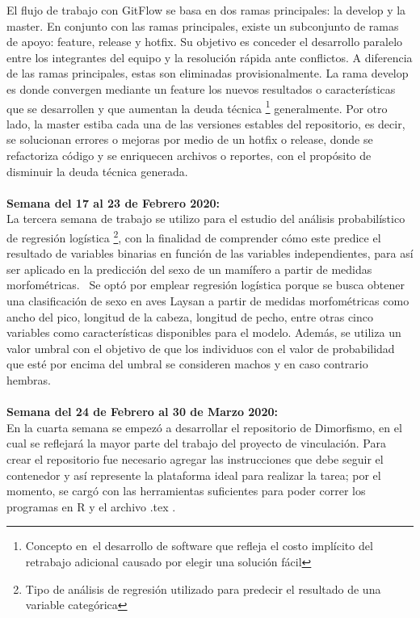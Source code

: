 \documentclass{article}
\begin{document}
     El flujo de trabajo con GitFlow se basa en dos ramas principales: la develop y la master. En conjunto con las ramas principales, existe un subconjunto de ramas de apoyo: feature, release y hotfix. Su objetivo es conceder el desarrollo paralelo entre los integrantes del equipo y la resolución rápida ante conflictos. A diferencia de las ramas principales, estas son eliminadas provisionalmente.
    La rama develop es donde convergen mediante un feature los nuevos resultados o características que se desarrollen y que aumentan la deuda técnica \footnote{Concepto en el desarrollo de software que refleja el costo implícito del retrabajo adicional causado por elegir una solución fácil} generalmente. Por otro lado, la master estiba cada una de las versiones estables del repositorio, es decir, se solucionan errores o mejoras por medio de un hotfix o release, donde se refactoriza código y se enriquecen archivos o reportes, con el propósito de disminuir la deuda técnica generada. 
    \\ \\ 
    \textbf{Semana del 17 al 23 de Febrero 2020:} \\
   La tercera semana de trabajo se utilizo para el estudio del análisis probabilístico de regresión logística \footnote{Tipo de análisis de regresión utilizado para predecir el resultado de una variable categórica}, con la finalidad de comprender cómo este predice el resultado de variables binarias en función de las variables independientes, para así ser aplicado en la predicción del sexo de un mamífero a partir de medidas morfométricas. 
    Se optó por emplear regresión logística porque se busca obtener una clasificación de sexo en aves Laysan a partir de medidas morfométricas como ancho del pico, longitud de la cabeza, longitud de pecho, entre otras cinco variables como características disponibles para el modelo. Además, se utiliza un valor umbral con el objetivo de que los individuos con el valor de probabilidad que esté por encima del umbral se consideren machos y en caso contrario hembras.
\\ \\
    \textbf{Semana del 24 de Febrero al 30 de Marzo 2020:} \\
    En la cuarta semana se empezó a desarrollar el repositorio de Dimorfismo, en el cual se reflejará la mayor parte del trabajo del proyecto de vinculación. Para crear el repositorio fue necesario agregar las instrucciones que debe seguir el contenedor y así represente la plataforma ideal para realizar la tarea; por el momento, se cargó con las herramientas suficientes para poder correr los programas en R y el archivo .tex .
\end{document}
